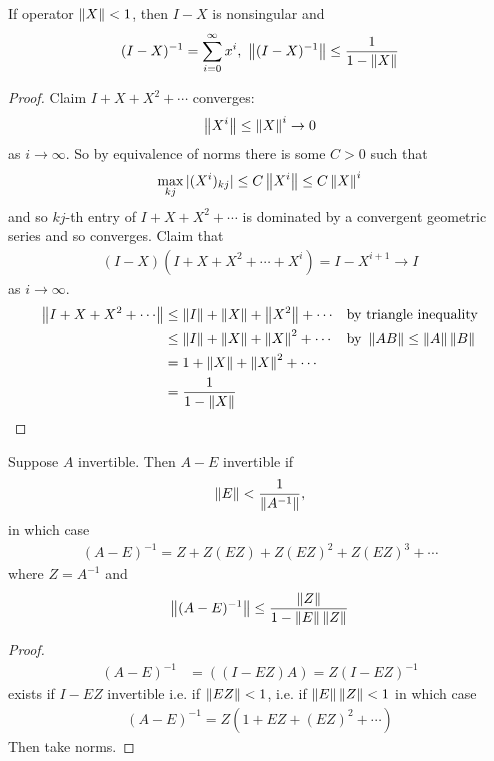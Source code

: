 \documentclass[11pt]{article}
\numberwithin{equation}{section}
\begin{document}
\begin{lemma}
    If operator $\left\| X \right\|<1$, then $I-X$ is nonsingular and \begin{align*}
        (I-X)^{-1}=\sum_{i=0}^{\infty} x^{i}, \ \left\| (I-X)^{-1} \right\| \leq \frac{1}{1 - \left\| X \right\|}
    \end{align*}
    \begin{proof}
        Claim $I + X + X^2 + \cdots$ converges:
        \begin{align*}
            \left\| X^i \right\| \leq \left\| X \right\|^i \rightarrow 0
        \end{align*}
        as $i \rightarrow \infty$. So by equivalence of norms there is some $C>0$ such that \begin{align*}
            \max_{kj} | (X^i)_{kj} | \leq C \left\| X^i \right\| \leq C \left\| X \right\|^i
        \end{align*}
        and so $kj$-th entry of $I + X + X^2 + \cdots$ is dominated by a convergent geometric series and so converges.
        Claim that \begin{align*}
            (I-X)\left(I+X+X^{2}+\cdots+X^{i}\right) = I - X^{i+1} \rightarrow I
        \end{align*}
        as $i \rightarrow \infty$. \begin{align*}
            \norm{I + X + X^2 + \cdots} &\leq \norm{I} + \norm{X} + \norm{X^2} + \cdots && \text{by triangle inequality} \\
            &\leq \norm{I} + \norm{X} + \norm{X}^2 + \cdots && \text{by }\norm{AB} \leq \norm{A} \norm{B} \\
            &= 1 + \norm{X} + \norm{X}^2 + \cdots && \\
            &= \frac{1}{1 - \norm{X}} &&
        \end{align*}
    \end{proof}
\end{lemma}

\begin{lemma}
    Suppose $A$ invertible. Then $A-E$ invertible if \begin{align*}
        \left\| E \right\| < \frac{1}{\left\| A^{-1} \right\|},
    \end{align*}
    in which case \begin{align*}
        (A-E)^{-1} = Z + Z(EZ) + Z(EZ)^2 + Z(EZ)^3 + \cdots 
    \end{align*}
    where $Z=A^{-1}$ and \begin{align*}
        \left\| (A-E)^{-1} \right\| \leq \frac{\left\| Z \right\|}{1-\left\| E \right\|\left\| Z \right\|}
    \end{align*} 
    \begin{proof}
        \begin{align*}
            (A-E)^{-1} &= \left( (I-EZ)A \right) = Z (I - EZ)^{-1}
        \end{align*}
        exists if $I-EZ$ invertible i.e. if $\left\| EZ \right\| < 1$, i.e. if $\left\| E \right\|\left\| Z \right\| < 1$ in which case \begin{align*}
            (A-E)^{-1} = Z(1+EZ + (EZ)^2 + \cdots)
        \end{align*}
        Then take norms.
    \end{proof}
\end{lemma}
\end{document}
